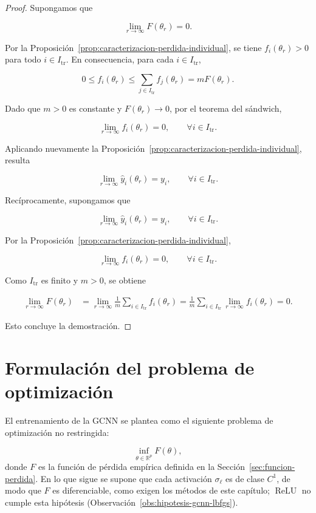 \documentclass[a4paper,openany,oneside,10pt]{report}
\theoremstyle{pnlTeorema}
\theoremstyle{pnlDefinicion}
\theoremstyle{pnlObservacion}
\begin{document}
\begin{proof}

Supongamos que

\[
\lim_{r\to\infty}F(\theta_r)=0.
\]

Por la Proposición~\ref{prop:caracterizacion-perdida-individual}, se tiene
$f_i(\theta_r)>0$ para todo $i\in I_{\mathrm{tr}}$.
En consecuencia, para cada $i\in I_{\mathrm{tr}}$,

\[
0\leq f_i(\theta_r)
\leq \sum_{j\in I_{\mathrm{tr}}}f_j(\theta_r)
=mF(\theta_r).
\]

Dado que $m>0$ es constante y
$F(\theta_r)\to 0$, por el teorema del sándwich,

\[
\lim_{r\to\infty}f_i(\theta_r)=0,
\qquad \forall i\in I_{\mathrm{tr}}.
\]

Aplicando nuevamente la Proposición~\ref{prop:caracterizacion-perdida-individual}, resulta

\[
\lim_{r\to\infty}\hat y_i(\theta_r)=y_i,
\qquad \forall i\in I_{\mathrm{tr}}.
\]

Recíprocamente, supongamos que

\[
\lim_{r\to\infty}\hat y_i(\theta_r)=y_i,
\qquad \forall i\in I_{\mathrm{tr}}.
\]

Por la Proposición~\ref{prop:caracterizacion-perdida-individual},

\[
\lim_{r\to\infty}f_i(\theta_r)=0,
\qquad \forall i\in I_{\mathrm{tr}}.
\]

Como $I_{\mathrm{tr}}$ es finito y $m>0$, se obtiene

\[
\begin{aligned}
\lim_{r\to\infty}F(\theta_r)
&=\lim_{r\to\infty}
\frac{1}{m}\sum_{i\in I_{\mathrm{tr}}}f_i(\theta_r)=\frac{1}{m}\sum_{i\in I_{\mathrm{tr}}}
\lim_{r\to\infty}f_i(\theta_r)=0.
\end{aligned}
\]

Esto concluye la demostración.
\end{proof}

\section{Formulación del problema de optimización}\label{sec:problema-entrenamiento}

El entrenamiento de la GCNN se plantea como el siguiente problema de optimización no restringida:

\[
\boxed{
\inf_{\theta\in\mathbb{R}^p}F(\theta),
}
\]
donde $F$ es la función de pérdida empírica definida en la Sección~\ref{sec:funcion-perdida}. En lo que sigue se supone que cada activación $\sigma_\ell$ es de clase $C^1$, de modo que $F$ es diferenciable, como exigen los métodos de este capítulo; $\operatorname{ReLU}$ no cumple esta hipótesis (Observación~\ref{obs:hipotesis-gcnn-lbfgs}).
\end{document}
